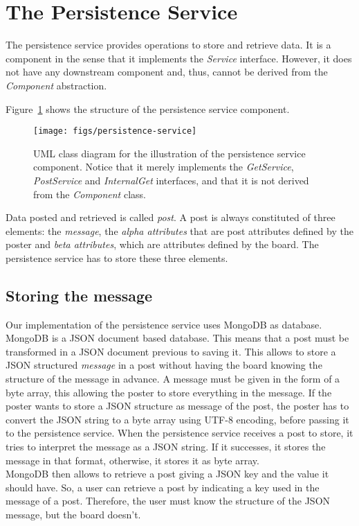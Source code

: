 \documentclass[oneside]{scrreprt}
\newcommand{\fig}[1]{Figure~\ref{#1}}
\begin{document}
\section{The Persistence Service}

The persistence service provides operations to store and
retrieve data. It is a component in the sense that it
implements the \emph{Service} interface. However, it
does not have any downstream component and, thus, cannot be
derived from the \emph{Component} abstraction.

\fig{fig:persistence-service} shows the structure of the persistence service
component.

\begin{figure}[ht]
\centerline{
\texttt{[image: figs/persistence-service]}}
\caption{UML class diagram for the illustration of the
persistence service component. Notice that it merely implements
the \emph{GetService}, \emph{PostService} and \emph{InternalGet} interfaces, and that it is not derived
from the \emph{Component} class.}
\label{fig:persistence-service}
\end{figure}

Data posted and retrieved is called \emph{post}. A post is always constituted of three elements: the \emph{message}, the \emph{alpha attributes} that are post attributes defined by the poster and \emph{beta attributes}, which are attributes defined by the board. The persistence service has to store these three elements.

\subsection{Storing the message}

Our implementation of the persistence service uses MongoDB as database. MongoDB is a JSON document based database. This means that a post must be transformed in a JSON document previous to saving it. This allows to store a JSON structured \emph{message} in a post without having the board knowing the structure of the message in advance. A message must be given in the form of a byte array, this allowing the poster to store everything in the message. If the poster wants to store a JSON structure as message of the post, the poster has to convert the JSON string to a byte array using UTF-8 encoding, before passing it to the persistence service. When the persistence service receives a post to store, it tries to interpret the message as a JSON string. If it successes, it stores the message in that format, otherwise, it stores it as byte array. \\
MongoDB then allows to retrieve a post giving a JSON key and the value it should have. So, a user can retrieve a post by indicating a key used in the message of a post. Therefore, the user must know the structure of the JSON message, but the board doesn't.
\end{document}
